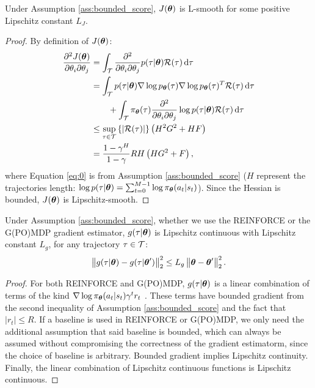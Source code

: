 \begin{lemma}\label{lemma:lsmooth}
	Under Assumption \ref{ass:bounded_score}, $J(\vtheta)$ is L-smooth for some positive Lipschitz constant $L_J$.
\end{lemma}
\begin{proof}
	By definition of $J(\vtheta)$:
	\begin{align}
	\Dij{J(\vtheta)}{\theta} 
	&= \int_{\Tspace}\Dij{}{\theta}p(\tau|\vtheta)\Reward(\tau)\de \tau
	\nonumber\\ 
	&= \int_{\Tspace}p(\tau|\vtheta)\score{\vtheta}{\tau}\score{\vtheta}{\tau}^T\Reward(\tau)\de \tau\\ 
	&\qquad+ \int_{\Tspace}\pol(\tau)\Dij{}{\theta}\log p(\tau|\vtheta)\Reward(\tau)\de \tau \nonumber\\
	&\leq \sup_{\tau \in \mathcal{T}} \left\{\left|\Reward(\tau)\right|\right\} \left(H^2\GRADLOG^2+H\HESSLOG\right) \label{eq:0}\\
	&= \frac{1-\gamma^H}{1-\gamma}RH\left(H\GRADLOG^2+\HESSLOG\right),\nonumber
	\end{align}
	where Equation \ref{eq:0} is from Assumption \ref{ass:bounded_score} ($H$ represent the trajectories length: $\log p(\tau|\vtheta) = \sum_{t=0}^{M-1}\log\pi_{\vtheta}(a_t\vert s_t)$).
	Since the Hessian is bounded, $J(\vtheta)$ is Lipschitz-smooth.
\end{proof}

\begin{lemma}\label{lemma:gsmooth}
	Under Assumption \ref{ass:bounded_score}, whether we use the REINFORCE or the G(PO)MDP gradient estimator, $g(\tau\vert\vtheta)$ is Lipschitz continuous with Lipschitz constant $L_g$, \ie for any trajectory $\tau\in\Tspace$:
	\[
	\norm[2]{g(\tau\vert\vtheta)-g(\tau\vert\vtheta')}^2 \leq L_g\norm[2]{\vtheta-\vtheta'}^2.
	\]
\end{lemma}
\begin{proof}
	For both REINFORCE and G(PO)MDP, $g(\tau\vert\vtheta)$ is a linear combination of terms of the kind $\nabla \log \pi_{\vtheta}(a_t\vert s_t)\gamma^t r_t$ \citep{peters2008reinforcement}. These terms have bounded gradient from the second inequality of Assumption \ref{ass:bounded_score} and the fact that $|r_t|\leq R$. If a baseline is used in REINFORCE or G(PO)MDP, we only need the additional assumption that said baseline is bounded, which can always be assumed without compromising the correctness of the gradient estimatorm, since the choice of baseline is arbitrary.
	Bounded gradient implies Lipschitz continuity. Finally, the linear combination of Lipschitz continuous functions is Lipschitz continuous.
\end{proof}

